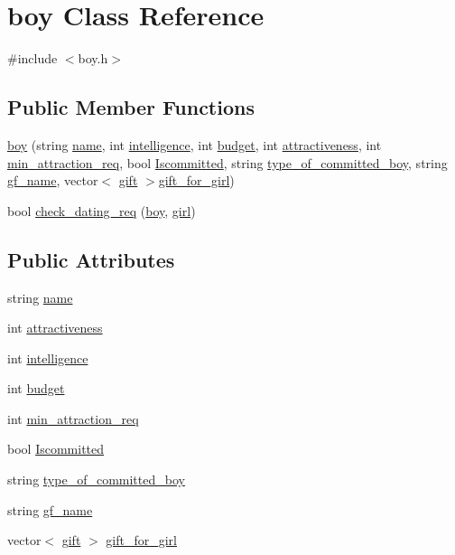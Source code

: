 \hypertarget{classboy}{}\section{boy Class Reference}
\label{classboy}


{\ttfamily \#include $<$boy.\+h$>$}

\subsection*{Public Member Functions}
\begin{DoxyCompactItemize}
\item 
\hyperlink{classboy_a792c56f272dc241a5dad5027c0451a27}{boy} (string \hyperlink{classboy_abcc2bcb0cb3f0465f5001e549a14a861}{name}, int \hyperlink{classboy_a3f66ab5d6e4d99adce1a8d33a4f2fb82}{intelligence}, int \hyperlink{classboy_a80d6bd6642a612cf0428ab56a2098316}{budget}, int \hyperlink{classboy_a8fff0880998598f79dc602a4345f0c67}{attractiveness}, int \hyperlink{classboy_a363e2d52a8f745aa5650ddc0007a323c}{min\+\_\+attraction\+\_\+req}, bool \hyperlink{classboy_a9eb8c2ade29520aec69b21ed659194bf}{Iscommitted}, string \hyperlink{classboy_abc7775597e8f8f89b44164bab24d188a}{type\+\_\+of\+\_\+committed\+\_\+boy}, string \hyperlink{classboy_ad15ed51808a67b109dd390a32d0ba87e}{gf\+\_\+name}, vector$<$ \hyperlink{classgift}{gift} $>$\hyperlink{classboy_abfc2b050b37f049e54ed586c824b15e6}{gift\+\_\+for\+\_\+girl})
\item 
bool \hyperlink{classboy_a19a486b4a3b1d5334eb481ee7eee4200}{check\+\_\+dating\+\_\+req} (\hyperlink{classboy}{boy}, \hyperlink{classgirl}{girl})
\end{DoxyCompactItemize}
\subsection*{Public Attributes}
\begin{DoxyCompactItemize}
\item 
string \hyperlink{classboy_abcc2bcb0cb3f0465f5001e549a14a861}{name}
\item 
int \hyperlink{classboy_a8fff0880998598f79dc602a4345f0c67}{attractiveness}
\item 
int \hyperlink{classboy_a3f66ab5d6e4d99adce1a8d33a4f2fb82}{intelligence}
\item 
int \hyperlink{classboy_a80d6bd6642a612cf0428ab56a2098316}{budget}
\item 
int \hyperlink{classboy_a363e2d52a8f745aa5650ddc0007a323c}{min\+\_\+attraction\+\_\+req}
\item 
bool \hyperlink{classboy_a9eb8c2ade29520aec69b21ed659194bf}{Iscommitted}
\item 
string \hyperlink{classboy_abc7775597e8f8f89b44164bab24d188a}{type\+\_\+of\+\_\+committed\+\_\+boy}
\item 
string \hyperlink{classboy_ad15ed51808a67b109dd390a32d0ba87e}{gf\+\_\+name}
\item 
vector$<$ \hyperlink{classgift}{gift} $>$ \hyperlink{classboy_abfc2b050b37f049e54ed586c824b15e6}{gift\+\_\+for\+\_\+girl}
\end{DoxyCompactItemize}



